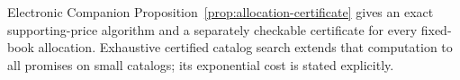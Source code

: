 Electronic Companion Proposition~\ref{prop:allocation-certificate} gives an exact supporting-price algorithm and a separately checkable certificate for every fixed-book allocation. Exhaustive certified catalog search extends that computation to all promises on small catalogs; its exponential cost is stated explicitly.
